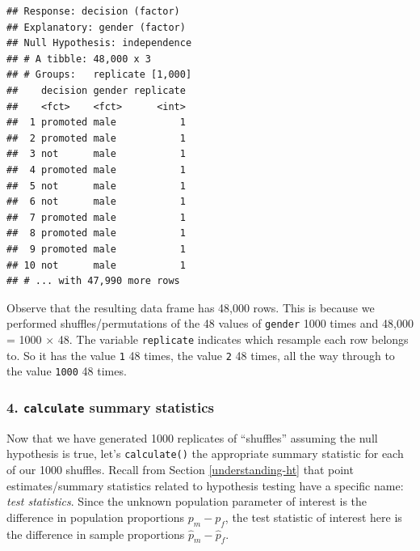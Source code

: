 \documentclass[
]{book}
\newenvironment{Shaded}{\begin{snugshade}}{\end{snugshade}}
\newcommand{\DataTypeTok}[1]{\textcolor[rgb]{0.13,0.29,0.53}{#1}}
\newcommand{\DecValTok}[1]{\textcolor[rgb]{0.00,0.00,0.81}{#1}}
\newcommand{\KeywordTok}[1]{\textcolor[rgb]{0.13,0.29,0.53}{\textbf{#1}}}
\newcommand{\NormalTok}[1]{#1}
\newcommand{\OperatorTok}[1]{\textcolor[rgb]{0.81,0.36,0.00}{\textbf{#1}}}
\newcommand{\StringTok}[1]{\textcolor[rgb]{0.31,0.60,0.02}{#1}}
\begin{document}
\begin{Shaded}
\end{Shaded}

\begin{verbatim}
## Response: decision (factor)
## Explanatory: gender (factor)
## Null Hypothesis: independence
## # A tibble: 48,000 x 3
## # Groups:   replicate [1,000]
##    decision gender replicate
##    <fct>    <fct>      <int>
##  1 promoted male           1
##  2 promoted male           1
##  3 not      male           1
##  4 promoted male           1
##  5 not      male           1
##  6 not      male           1
##  7 promoted male           1
##  8 promoted male           1
##  9 promoted male           1
## 10 not      male           1
## # ... with 47,990 more rows
\end{verbatim}

Observe that the resulting data frame has 48,000 rows. This is because we performed shuffles/permutations of the 48 values of \texttt{gender} 1000 times and 48,000 = 1000 \(\times\) 48. The variable \texttt{replicate} indicates which resample each row belongs to. So it has the value \texttt{1} 48 times, the value \texttt{2} 48 times, all the way through to the value \texttt{1000} 48 times.

\hypertarget{calculate-summary-statistics}{%
\subsubsection*{\texorpdfstring{4. \texttt{calculate} summary statistics}{4. calculate summary statistics}}\label{calculate-summary-statistics}}

Now that we have generated 1000 replicates of ``shuffles'' assuming the null hypothesis is true, let's \texttt{calculate()}  the appropriate summary statistic for each of our 1000 shuffles. Recall from Section \ref{understanding-ht} that point estimates/summary statistics related to hypothesis testing have a specific name: \emph{test statistics}. Since the unknown population parameter of interest is the difference in population proportions \(p_{m} - p_{f}\), the test statistic of interest here is the difference in sample proportions \(\widehat{p}_{m} - \widehat{p}_{f}\).
\end{document}
